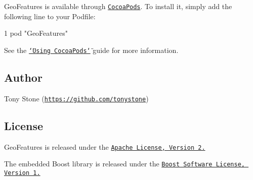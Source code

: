 Geo\+Features is available through \href{http://cocoapods.org}{\tt Cocoa\+Pods}. To install it, simply add the following line to your Podfile\+:


\begin{DoxyCode}
1 pod "GeoFeatures"
\end{DoxyCode}


See the \href{https://guides.cocoapods.org/using/using-cocoapods.html}{\tt \char`\"{}\+Using Cocoa\+Pods\char`\"{}} guide for more information.

\subsection*{Author}

Tony Stone (\href{https://github.com/tonystone}{\tt https\+://github.\+com/tonystone})

\subsection*{License}

Geo\+Features is released under the \href{http://www.apache.org/licenses/LICENSE-2.0.html}{\tt Apache License, Version 2.}

The embedded Boost library is released under the \href{http://www.boost.org/users/license.html}{\tt Boost Software License, Version 1.} 